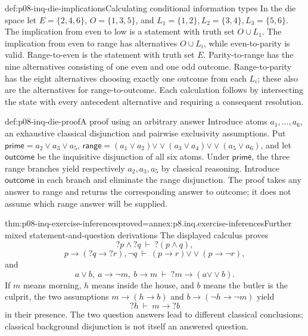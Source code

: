 \begin{hbexample}{def:p08-inq-die-implications}{Calculating conditional information types}
In the die space let \(E=\{2,4,6\}\), \(O=\{1,3,5\}\), and
\(L_1=\{1,2\},L_2=\{3,4\},L_3=\{5,6\}\).
The implication from even to low is a statement with truth set
\(O\cup L_1\). The implication from even to range has alternatives
\(O\cup L_i\), while even-to-parity is valid. Range-to-even is the
statement with truth set \(E\). Parity-to-range has the nine alternatives
consisting of one even and one odd outcome. Range-to-parity has the eight
alternatives choosing exactly one outcome from each \(L_i\); these also
are the alternatives for range-to-outcome. Each calculation follows by
intersecting the state with every antecedent alternative and requiring a
consequent resolution.
\end{hbexample}

\begin{hbexample}{def:p08-inq-die-proof}{A proof using an arbitrary answer}
Introduce atoms \(a_1,\ldots,a_6\), an exhaustive classical disjunction
and pairwise exclusivity assumptions. Put
\(\mathsf{prime}=a_2\lor a_3\lor a_5\),
\(\mathsf{range}=(a_1\lor a_2)\mathbin{\vee\!\vee}
 (a_3\lor a_4)\mathbin{\vee\!\vee}(a_5\lor a_6)\), and let
\(\mathsf{outcome}\) be the inquisitive disjunction of all six atoms.
Under \(\mathsf{prime}\), the three range branches yield respectively
\(a_2,a_3,a_5\) by classical reasoning. Introduce \(\mathsf{outcome}\)
in each branch and eliminate the range disjunction. The proof takes any
answer to range and returns the corresponding answer to outcome; it
does not assume which range answer will be supplied.
\end{hbexample}

\begin{hbtheorem}{thm:p08-inq-exercise-inferences}{proved=annex:p8.inq.exercise-inferences}{Further mixed statement-and-question derivations}
The displayed calculus proves
\[
 ?p\land?q\ \vdash\ ?(p\land q),
\]
\[
 p\to(?q\to?r),\neg q\ \vdash\
 (p\to r)\mathbin{\vee\!\vee}(p\to\neg r),
\]
and
\[
 a\lor b,\ a\to\neg m,\ b\to m\ \vdash\
 ?m\to(a\mathbin{\vee\!\vee}b).
\]
If \(m\) means morning, \(h\) means inside the house, and \(b\) means
the butler is the culprit, the two assumptions
\(m\to(h\to b)\) and \(b\to(\neg h\to\neg m)\) yield
\[
 ?h\ \vdash\ m\to?b
\]
in their presence. The two question answers lead to different classical
conclusions; classical background disjunction is not itself an answered question.
\end{hbtheorem}

